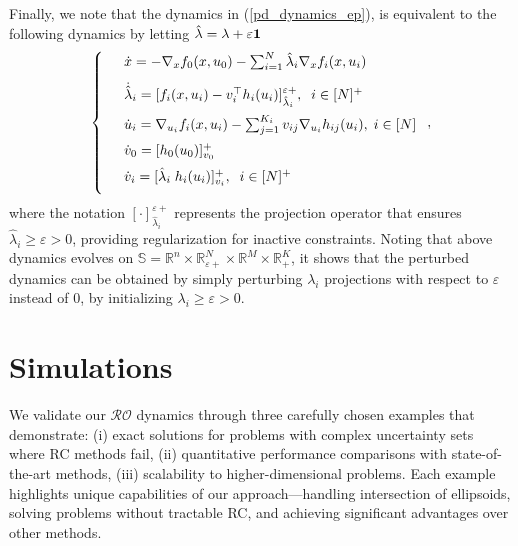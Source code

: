 \documentclass[journal,twoside,web]{ieeecolor}
\newcommand{\rev}[1]{\textcolor{revisionblue}{#1}}
\begin{document}
Finally, we note that the dynamics in (\ref{pd_dynamics_ep}), is equivalent to the following dynamics by letting $\hat{\lambda}=\lambda+\varepsilon {\bf 1}$
\begin{align} \label{pd_dynamics_0}
\left\{
\begin{array}{cl}
\vspace{3mm}
&\dot x=-\nabla_x f_0(x,u_0)-\sum_{i=1}^N\hat{\lambda}_i \nabla_x f_i(x,u_i)\\
\vspace{2mm}
&\dot{\hat{\lambda}}_i=[f_i(x,u_i)-v_i^\top h_i(u_i)]_{\hat{\lambda}_i}^{\varepsilon +},\;\; i\in[N]^+\\
\vspace{2mm}
&\dot u_i=\nabla_{u_i}f_i(x,u_i)-\sum_{j=1}^{K_i} v_{ij} \nabla_{u_i} h_{ij}(u_i),\; i\in[N]\\
\vspace{2mm}
&\dot{v}_0=[h_0(u_0)]_{v_0}^+\\
\vspace{2mm}
&\dot v_i=[\hat{\lambda}_i \; h_i(u_i)]_{v_i}^+,\;\;i\in[N]^+
\end{array}\right.,
\end{align}
\rev{where the notation $[\cdot]_{\hat{\lambda}_i}^{\varepsilon+}$ represents the projection operator that ensures $\hat{\lambda}_i \geq \varepsilon > 0$, providing regularization for inactive constraints.}
Noting that above dynamics evolves on $\mathbb{S}= \mathbb{R}^n \times \mathbb{R}^N_{\varepsilon +} \times \mathbb{R}^M \times \mathbb{R}^K_+$, it shows that the perturbed dynamics can be obtained by simply perturbing $\lambda_i$ projections with respect to $\varepsilon$ instead of $0$, by initializing $\lambda_i \geq \varepsilon > 0$.


\section{Simulations}\label{section_simulations}



\rev{We validate our $\mathcal{RO}$ dynamics through three carefully chosen examples that demonstrate: (i) exact solutions for problems with complex uncertainty sets where RC methods fail, (ii) quantitative performance comparisons with state-of-the-art methods, (iii) scalability to higher-dimensional problems. Each example highlights unique capabilities of our approach—handling intersection of ellipsoids, solving problems without tractable RC, and achieving significant advantages over other methods.}
\end{document}
